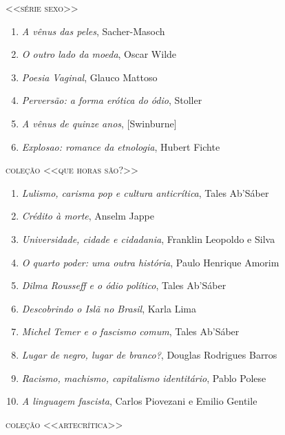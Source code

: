 \pagebreak

{\large\textsc{<<série sexo>>}}

\begin{enumerate}
\setlength\parskip{4.2pt}
\setlength\itemsep{-1.4mm}

\item \textit{A vênus das peles}, Sacher{}-Masoch
\item \textit{O outro lado da moeda}, Oscar Wilde
\item \textit{Poesia Vaginal}, Glauco Mattoso 
\item \textit{Perversão: a forma erótica do ódio}, Stoller
\item \textit{A vênus de quinze anos}, [Swinburne]
\item \textit{Explosao: romance da etnologia}, Hubert Fichte

\end{enumerate}

\medskip
{\large\textsc{coleção <<que horas são?>>}}

\begin{enumerate}
\setlength\parskip{4.2pt}
\setlength\itemsep{-1.4mm}
\item \textit{Lulismo, carisma pop e cultura anticrítica}, Tales Ab'Sáber
\item \textit{Crédito à morte}, Anselm Jappe
\item \textit{Universidade, cidade e cidadania}, Franklin Leopoldo e Silva
\item \textit{O quarto poder: uma outra história}, Paulo Henrique Amorim
\item \textit{Dilma Rousseff e o ódio político}, Tales Ab'Sáber
\item \textit{Descobrindo o Islã no Brasil}, Karla Lima
\item \textit{Michel Temer e o fascismo comum}, Tales Ab'Sáber
\item \textit{Lugar de negro, lugar de branco?}, Douglas Rodrigues Barros
\item \textit{Racismo, machismo, capitalismo identitário}, Pablo Polese
\item \textit{A linguagem fascista}, Carlos Piovezani e Emilio Gentile
\end{enumerate}

\medskip
{\large\textsc{coleção <<artecrítica>>}}

